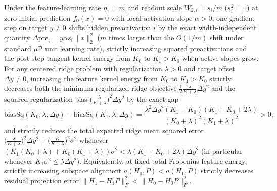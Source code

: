 \begin{lemma}\label{lem:feature_learning_advantage}
\leanok
{}
Under the feature-learning rate $\eta_1 = m$ and readout scale $W_{2,i} = s_i/m$ ($s_i^2=1$) at zero initial prediction $f_0(x)=0$ with local activation slope $\alpha>0$, one gradient step on target $y\ne 0$ shifts hidden preactivation $i$ by the exact width-independent quantity $\Delta\mathrm{pre}_i = y\alpha s_i\|x\|_2^2$ ($m$ times larger than the $O(1/m)$ shift under standard $\mu$P unit learning rate), strictly increasing squared preactivations and the post-step tangent kernel energy from $K_0$ to $K_1 > K_0$ when active slopes grow. For any centered ridge problem with regularization $\lambda>0$ and target offset $\Delta y\ne 0$, increasing the feature kernel energy from $K_0$ to $K_1 > K_0$ strictly decreases both the minimum regularized ridge objective $\frac{1}{2}\frac{\lambda}{K+\lambda}\Delta y^2$ and the squared regularization bias $\bigl(\frac{\lambda}{K+\lambda}\bigr)^2\Delta y^2$ by the exact gap
\[
\mathrm{biasSq}(K_0,\lambda,\Delta y) - \mathrm{biasSq}(K_1,\lambda,\Delta y)
= \frac{\lambda^2 \Delta y^2 (K_1 - K_0)(K_1 + K_0 + 2\lambda)}{(K_0+\lambda)^2(K_1+\lambda)^2} > 0,
\]
and strictly reduces the total expected ridge mean squared error $\bigl(\frac{\lambda}{K+\lambda}\bigr)^2\Delta y^2 + \bigl(\frac{K}{K+\lambda}\bigr)^2\sigma^2$ whenever $(K_1(K_0+\lambda)+K_0(K_1+\lambda))\sigma^2 < \lambda(K_1+K_0+2\lambda)\Delta y^2$ (in particular whenever $K_1\sigma^2 \le \lambda\Delta y^2$). Equivalently, at fixed total Frobenius feature energy, strictly increasing subspace alignment $a(H_0,P) < a(H_1,P)$ strictly decreases residual projection error $\lVert H_1 - H_1 P\rVert_F^2 < \lVert H_0 - H_0 P\rVert_F^2$.
\end{lemma}
